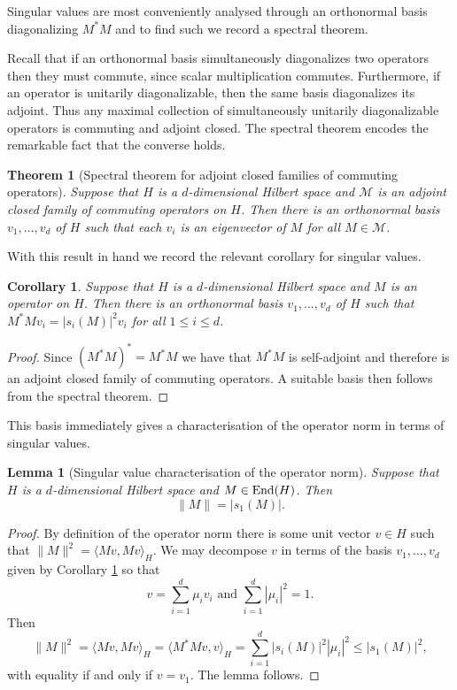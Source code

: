 \documentclass[12pt]{amsart}
\numberwithin{equation}{section}
\theoremstyle{plain}
\newtheorem{theorem}[subsection]{Theorem}
\newtheorem{lemma}[subsection]{Lemma}
\newtheorem{corollary}[subsection]{Corollary}
\theoremstyle{definition}
\renewcommand{\leq}{\leqslant}
\providecommand{\End}{\mathop{\rm End}\nolimits}
\begin{document}
Singular values are most conveniently analysed through an orthonormal basis diagonalizing $M^*M$ and to find such we record a spectral theorem.

Recall that if an orthonormal basis simultaneously diagonalizes two operators then they must commute, since scalar multiplication commutes.  Furthermore, if an operator is unitarily diagonalizable, then the same basis diagonalizes its adjoint.  Thus any maximal collection of simultaneously unitarily diagonalizable operators is commuting and adjoint closed.  The spectral theorem encodes the remarkable fact that the converse holds.
\begin{theorem}[Spectral theorem for adjoint closed families of commuting operators]
Suppose that $H$ is a $d$-dimensional Hilbert space and $\mathcal{M}$ is an adjoint closed family of commuting operators on $H$. Then there is an orthonormal basis $v_1,\dots,v_d$ of $H$ such that each $v_i$ is an eigenvector of $M$ for all $M \in \mathcal{M}$.
\end{theorem}
With this result in hand we record the relevant corollary for singular values.
\begin{corollary}\label{cor.speccor}
Suppose that $H$ is a $d$-dimensional Hilbert space and $M$ is an operator on $H$.  Then there is an orthonormal basis $v_1,\dots,v_d$ of $H$ such that $M^*Mv_i = |s_i(M)|^2v_i$ for all $1 \leq i \leq d$.
\end{corollary}
\begin{proof}
Since $(M^*M)^*=M^*M$ we have that $M^*M$ is self-adjoint and therefore is an adjoint closed family of commuting operators.  A suitable basis then follows from the spectral theorem.
\end{proof}
This basis immediately gives a characterisation of the operator norm in terms of singular values.
\begin{lemma}[Singular value characterisation of the operator norm]
Suppose that $H$ is a $d$-dimensional Hilbert space and $M \in \End(H)$. Then
\begin{equation*}
\|M\|=|s_1(M)|.
\end{equation*}
\end{lemma}
\begin{proof}
By definition of the operator norm there is some unit vector $v \in H$ such that $\|M\|^2 = \langle Mv,Mv\rangle_H$.  We may decompose $v$ in terms of the basis $v_1,\dots,v_d$ given by Corollary \ref{cor.speccor} so that
\begin{equation*}
v=\sum_{i=1}^d{\mu_iv_i} \textrm{ and } \sum_{i=1}^d{|\mu_i|^2} = 1.
\end{equation*}
Then
\begin{equation*}
\|M\|^2=\langle Mv,Mv\rangle_H = \langle M^*Mv,v\rangle_H =\sum_{i=1}^d{|s_i(M)|^2|\mu_i|^2} \leq |s_1(M)|^2,
\end{equation*}
with equality if and only if $v=v_1$.  The lemma follows.
\end{proof}
\end{document}
